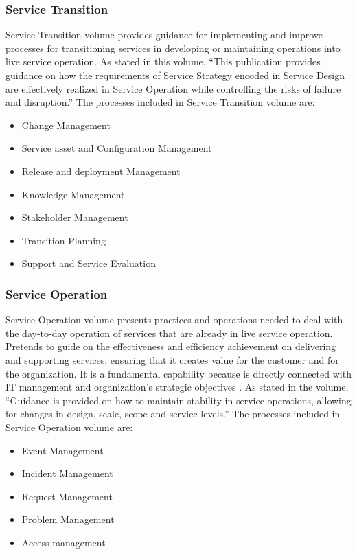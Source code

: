 \subsubsection{Service Transition} 

Service Transition volume provides guidance for implementing and improve processes for transitioning services in developing or maintaining operations into live service operation. As stated in this volume, ``This publication provides guidance on how the requirements of Service Strategy encoded in Service Design are effectively realized in Service Operation while controlling the risks of failure and disruption.''\cite{itilST} The processes included in Service Transition volume are:

\begin{itemize}
  \item Change Management
  \item Service asset and Configuration Management
  \item Release and deployment Management
  \item Knowledge Management
  \item Stakeholder Management
  \item Transition Planning 
  \item Support and Service Evaluation 
\end{itemize} 

\subsubsection{Service Operation} 

Service Operation volume presents practices and operations needed to deal with the day-to-day operation of services that are already in live service operation. Pretends to guide on the effectiveness and efficiency achievement on delivering and supporting services, ensuring that it creates value for the customer and for the organization. It is a fundamental capability because is directly connected with IT management and organization's strategic objectives . As stated in the volume, ``Guidance is provided on how to maintain stability in service operations, allowing for changes in design, scale, scope and service levels.''\cite{itilSO} The processes included in Service Operation volume are:

\begin{itemize}
  \item Event Management
  \item Incident Management
  \item Request Management
  \item Problem Management
  \item Access management
\end{itemize} 

